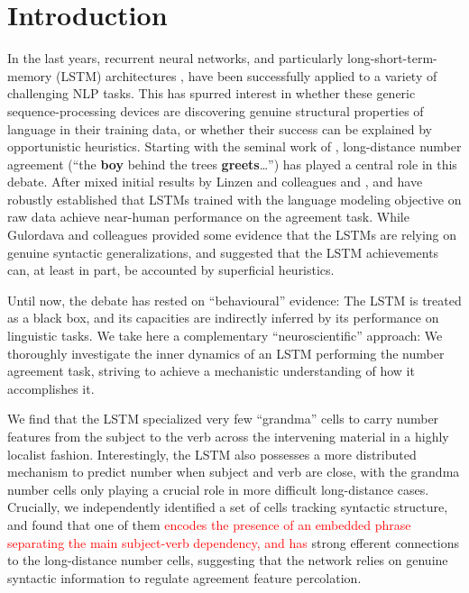 \section{Introduction}

In the last years, recurrent neural networks, and particularly
long-short-term-memory (LSTM) architectures
\cite{Hochreiter:Schmidhuber:1997}, have been successfully applied to
a variety of challenging NLP tasks. This has spurred interest in
whether these generic sequence-processing devices are discovering
genuine structural properties of language in their training data, or
whether their success can be explained by opportunistic
heuristics. Starting with the seminal work of
, long-distance number agreement (``the
\textbf{boy} behind the trees \textbf{greets}\ldots'') has played a
central role in this debate. After mixed initial results by Linzen and
colleagues and ,
 and  have
robustly established that LSTMs trained with the language modeling
objective on raw data achieve near-human performance on the
agreement task. While Gulordava and colleagues provided some evidence that the
LSTMs are relying on genuine syntactic generalizations,
 and 
suggested that the LSTM achievements can, at least in part, be
accounted by superficial heuristics.

Until now, the debate has rested on ``behavioural'' evidence: The
LSTM is treated as a black box, and its capacities are indirectly
inferred by its performance on linguistic tasks. We take here a
complementary ``neuroscientific'' approach: We thoroughly investigate
the inner dynamics of an LSTM performing the number agreement task,
striving to achieve a mechanistic understanding of how it accomplishes
it.

We find that the LSTM specialized very few ``grandma'' cells
\cite{Bowers:2009} to carry number features from the subject to the
verb across the intervening material in a highly localist
fashion. Interestingly, the LSTM also possesses a more distributed
mechanism to predict number when subject and verb are close, with the
grandma number cells only playing a crucial role in more difficult
long-distance cases. Crucially, we independently identified a set of
cells tracking syntactic structure, and found that one of them \textcolor{red}{encodes the presence of an embedded phrase separating the main subject-verb dependency, and has} strong efferent connections to the long-distance number cells,
suggesting that the network relies on genuine syntactic information to
regulate agreement feature percolation.

